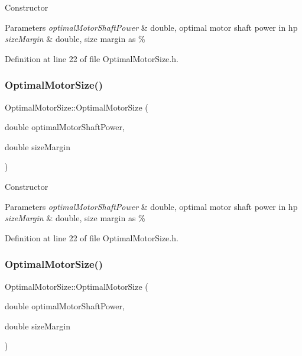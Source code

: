 Constructor 
\begin{DoxyParams}{Parameters}
{\em optimal\+Motor\+Shaft\+Power} & double, optimal motor shaft power in hp \\
\hline
{\em size\+Margin} & double, size margin as \% \\
\hline
\end{DoxyParams}


Definition at line 22 of file Optimal\+Motor\+Size.\+h.

\mbox{\label{class_optimal_motor_size_ad051dd00b8879fc4232536c936e98be1}} 
\subsubsection{\texorpdfstring{Optimal\+Motor\+Size()}{OptimalMotorSize()}\hspace{0.1cm}{\footnotesize\ttfamily [2/3]}}
{\footnotesize\ttfamily Optimal\+Motor\+Size\+::\+Optimal\+Motor\+Size (\begin{DoxyParamCaption}\item[{double}]{optimal\+Motor\+Shaft\+Power,  }\item[{double}]{size\+Margin }\end{DoxyParamCaption})\hspace{0.3cm}{\ttfamily [inline]}}

Constructor 
\begin{DoxyParams}{Parameters}
{\em optimal\+Motor\+Shaft\+Power} & double, optimal motor shaft power in hp \\
\hline
{\em size\+Margin} & double, size margin as \% \\
\hline
\end{DoxyParams}


Definition at line 22 of file Optimal\+Motor\+Size.\+h.

\mbox{\label{class_optimal_motor_size_ad051dd00b8879fc4232536c936e98be1}} 
\subsubsection{\texorpdfstring{Optimal\+Motor\+Size()}{OptimalMotorSize()}\hspace{0.1cm}{\footnotesize\ttfamily [3/3]}}
{\footnotesize\ttfamily Optimal\+Motor\+Size\+::\+Optimal\+Motor\+Size (\begin{DoxyParamCaption}\item[{double}]{optimal\+Motor\+Shaft\+Power,  }\item[{double}]{size\+Margin }\end{DoxyParamCaption})\hspace{0.3cm}{\ttfamily [inline]}}

